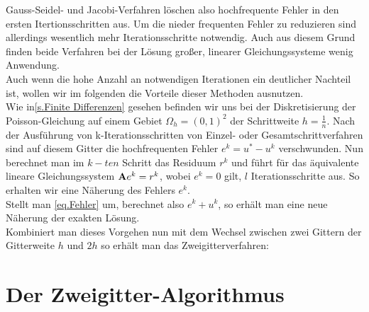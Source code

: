 Gauss-Seidel- und Jacobi-Verfahren löschen also hochfrequente Fehler in den ersten Itertionsschritten aus. Um die nieder frequenten Fehler zu reduzieren sind allerdings wesentlich mehr Iterationsschritte notwendig. Auch aus diesem Grund finden beide Verfahren bei der Lösung großer, linearer Gleichungssysteme wenig Anwendung. \\
Auch wenn die hohe Anzahl an notwendigen Iterationen ein deutlicher Nachteil ist, wollen wir im folgenden die Vorteile dieser Methoden ausnutzen. \\%
Wie in\autoref{s.Finite Differenzen} gesehen befinden wir uns bei der Diskretisierung der Poisson-Gleichung auf einem Gebiet $\Omega_{h} = (0,1)^{2}$ der Schrittweite $h = \frac {1} {n}$. Nach der Ausführung von k-Iterationsschritten von Einzel- oder Gesamtschrittverfahren sind auf diesem Gitter die hochfrequenten Fehler $e^{k} = u^{*} - u^{k}$ verschwunden. Nun berechnet man im $k-ten$ Schritt das Residuum $r^{k}$ und führt für das äquivalente lineare Gleichungssystem ${\textbf{A}}e^{k} = r^{k}$, wobei $e^{k} = 0$ gilt, $l$ Iterationsschritte aus. So erhalten wir eine Näherung des Fehlers $e^{k}$. \\
Stellt man \autoref{eq.Fehler} um, berechnet also $e^{k} + u^{k}$, so erhält man eine neue Näherung der exakten Lösung. \\
Kombiniert man dieses Vorgehen nun mit dem Wechsel zwischen zwei Gittern der Gitterweite $h$ und $2h$ so erhält man das Zweigitterverfahren:

\section{Der Zweigitter-Algorithmus}\label{s.Der Zweigitter-Algorithmus}

